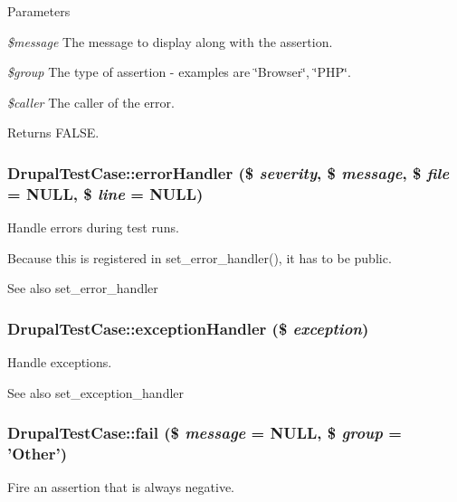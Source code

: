 \begin{DoxyParams}{Parameters}
\item[{\em \$message}]The message to display along with the assertion. \item[{\em \$group}]The type of assertion -\/ examples are \char`\"{}Browser\char`\"{}, \char`\"{}PHP\char`\"{}. \item[{\em \$caller}]The caller of the error. \end{DoxyParams}
\begin{DoxyReturn}{Returns}
FALSE. 
\end{DoxyReturn}
\hypertarget{classDrupalTestCase_aaddb077405f3177d94d44b690b1d869f}{
\subsubsection[{errorHandler}]{\setlength{\rightskip}{0pt plus 5cm}DrupalTestCase::errorHandler (\$ {\em severity}, \/  \$ {\em message}, \/  \$ {\em file} = {\ttfamily NULL}, \/  \$ {\em line} = {\ttfamily NULL})}}
\label{classDrupalTestCase_aaddb077405f3177d94d44b690b1d869f}
Handle errors during test runs.

Because this is registered in set\_\-error\_\-handler(), it has to be public. \begin{DoxySeeAlso}{See also}
set\_\-error\_\-handler 
\end{DoxySeeAlso}
\hypertarget{classDrupalTestCase_ab7cf6472833e2d3fd4de5831cfd61af9}{
\subsubsection[{exceptionHandler}]{\setlength{\rightskip}{0pt plus 5cm}DrupalTestCase::exceptionHandler (\$ {\em exception})}}
\label{classDrupalTestCase_ab7cf6472833e2d3fd4de5831cfd61af9}
Handle exceptions.

\begin{DoxySeeAlso}{See also}
set\_\-exception\_\-handler 
\end{DoxySeeAlso}
\hypertarget{classDrupalTestCase_ae90616a11b0e3df050113d79765dc226}{
\subsubsection[{fail}]{\setlength{\rightskip}{0pt plus 5cm}DrupalTestCase::fail (\$ {\em message} = {\ttfamily NULL}, \/  \$ {\em group} = {\ttfamily 'Other'})}}
\label{classDrupalTestCase_ae90616a11b0e3df050113d79765dc226}
Fire an assertion that is always negative.


